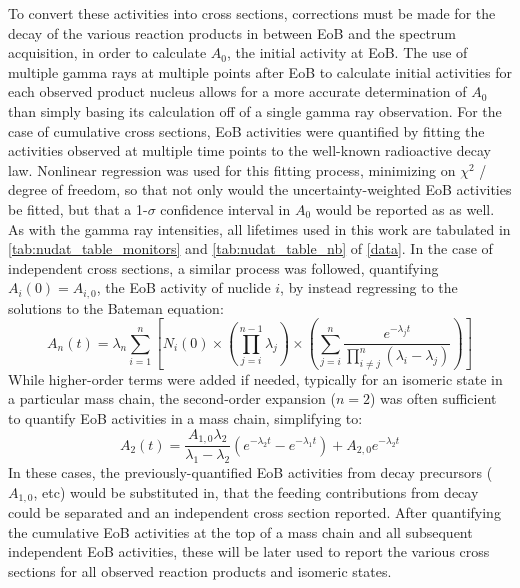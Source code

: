 \documentclass[3p]{elsarticle}
\newcommand{\pp}[1]{\left( #1\right)}
\begin{document}
To convert these activities into cross sections, corrections must be made for the decay of the various reaction products in  between EoB and the spectrum acquisition, in order to calculate $A_0$, the initial activity at EoB.
The use of  multiple gamma rays at multiple points after EoB to calculate initial activities  for each observed product nucleus allows for a more accurate  determination of $A_0$ than simply basing its calculation off of a single gamma ray observation.
For the case of cumulative cross sections, EoB activities were quantified by fitting the activities observed at multiple time points to the well-known radioactive decay law.
Nonlinear regression was used for this fitting process, minimizing on $\chi^2$ / degree of freedom, so that not only would the uncertainty-weighted EoB activities be fitted, but that a 1-$\sigma$ confidence interval in $A_0$ would be reported as as well.
As with the gamma ray intensities, all lifetimes used in this work are tabulated in \autoref{tab:nudat_table_monitors} and \autoref{tab:nudat_table_nb} of \ref{data}.
In the case of independent cross sections, a similar process was followed, quantifying $A_i\pp{0} = A_{i,0}$, the EoB activity of nuclide $i$, by instead regressing to the solutions to the Bateman equation:
\begin{equation}
A_n\pp{t} = \lambda_n \sum_{i=1}^n \left[  N_i\pp{0} \times \pp{\prod_{j=i}^{n-1}\lambda_j} \times \pp{\sum_{j=i}^n \dfrac{e^{-\lambda_j t}}{\prod_{i\neq j}^n \pp{\lambda_i - \lambda_j}}  }   \right]
\end{equation}
While higher-order terms were added if needed, typically for an isomeric state in a particular mass chain,  the second-order expansion ($n=2$) was often sufficient to quantify EoB activities in a mass chain, simplifying to:
\begin{equation}
A_2\pp{t} = \dfrac{A_{1,0}\lambda_2}{\lambda_1 - \lambda_2} \pp{e^{-\lambda_2 t} - e^{-\lambda_1 t}} + A_{2,0} e^{-\lambda_2 t}
\end{equation}
In these cases, the previously-quantified EoB activities from decay precursors ($A_{1,0}$, etc) would be substituted in, that the feeding contributions from decay could be separated and an independent cross section reported.
After quantifying the cumulative EoB activities at the top of a mass chain and all subsequent independent EoB activities, these will be later used to report the various cross sections for all observed reaction products and isomeric states. 
\end{document}

